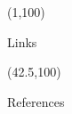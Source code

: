 \documentclass[final]{beamer}
\begin{document}
\begin{frame}{}
    \begin{textblock}{39.5}(1,100)
      \begin{exampleblock}{Links}
        
      \end{exampleblock}
    \end{textblock}

    \begin{textblock}{40.5}(42.5,100)
      \begin{block}{References}
        \small
      \end{block}
    \end{textblock}

  \end{frame}
\end{document}
